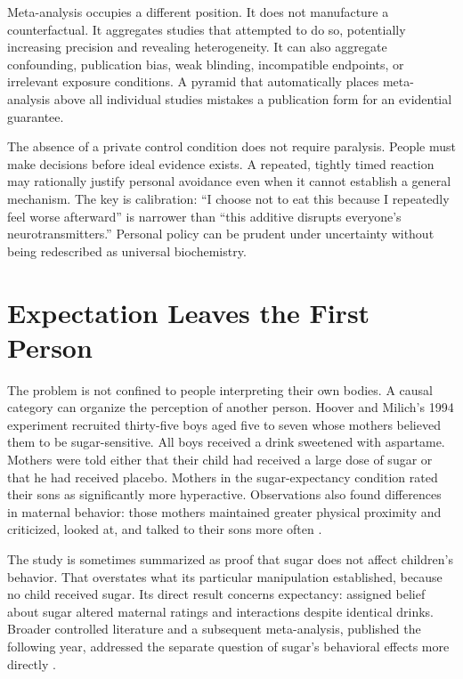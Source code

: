 \documentclass[11pt]{article}
\begin{document}
Meta-analysis occupies a different position. It does not manufacture a counterfactual. It aggregates studies that attempted to do so, potentially increasing precision and revealing heterogeneity. It can also aggregate confounding, publication bias, weak blinding, incompatible endpoints, or irrelevant exposure conditions. A pyramid that automatically places meta-analysis above all individual studies mistakes a publication form for an evidential guarantee.

The absence of a private control condition does not require paralysis. People must make decisions before ideal evidence exists. A repeated, tightly timed reaction may rationally justify personal avoidance even when it cannot establish a general mechanism. The key is calibration: ``I choose not to eat this because I repeatedly feel worse afterward'' is narrower than ``this additive disrupts everyone's neurotransmitters.'' Personal policy can be prudent under uncertainty without being redescribed as universal biochemistry.

\section{Expectation Leaves the First Person}

The problem is not confined to people interpreting their own bodies. A causal category can organize the perception of another person. Hoover and Milich's 1994 experiment recruited thirty-five boys aged five to seven whose mothers believed them to be sugar-sensitive. All boys received a drink sweetened with aspartame. Mothers were told either that their child had received a large dose of sugar or that he had received placebo. Mothers in the sugar-expectancy condition rated their sons as significantly more hyperactive. Observations also found differences in maternal behavior: those mothers maintained greater physical proximity and criticized, looked at, and talked to their sons more often 
\citep{hoover1994sugar}.

The study is sometimes summarized as proof that sugar does not affect children's behavior. That overstates what its particular manipulation established, because no child received sugar. Its direct result concerns expectancy: assigned belief about sugar altered maternal ratings and interactions despite identical drinks. Broader controlled literature and a subsequent meta-analysis, published the following year, addressed the separate question of sugar's behavioral effects more directly 
\citep{wolraich1995sugar}.
\end{document}
